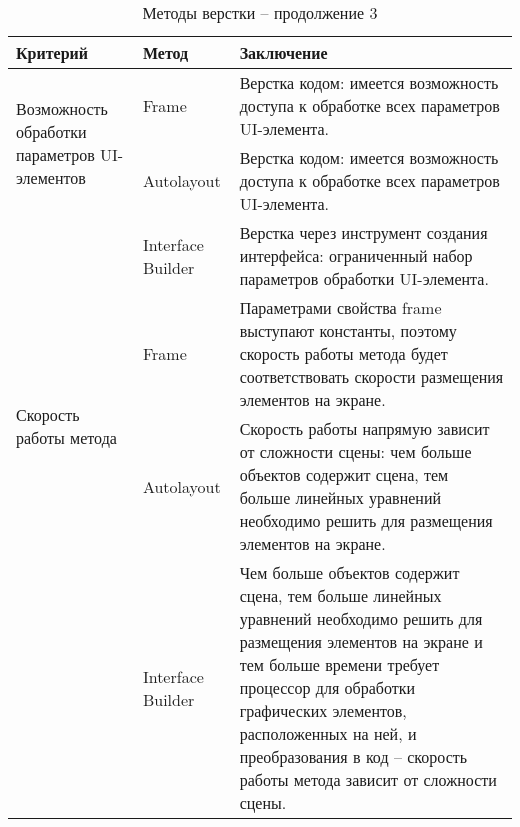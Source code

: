 \begin{table}[H]
	\centering
	\caption{Методы верстки -- продолжение 3}
	\label{mko_table_0}
	\begin{tabular}{|p{2.9cm}|p{2.9cm}|p{9.5cm}|}
		\hline
		\textbf{Критерий} & \textbf{Метод} & \textbf{Заключение} \\
		\hline
		\multirow{2}{3.1cm}{Возможность обработки параметров UI-элементов} & Frame & 
		Верстка кодом: имеется возможность доступа к обработке всех параметров UI-элемента.\\
		\cline{2-3} & Autolayout & 
		Верстка кодом: имеется возможность доступа к обработке всех параметров UI-элемента.\\
		\cline{2-3} & Interface Builder & 
		Верстка через инструмент создания интерфейса: ограниченный набор параметров обработки UI-элемента.\\
		\hline
		\multirow{2}{3.1cm}{Скорость работы метода} & Frame & 
		Параметрами свойства frame выступают константы, поэтому скорость работы метода будет соответствовать скорости размещения элементов на экране.\\
		\cline{2-3} & Autolayout & 
		Скорость работы напрямую зависит от сложности сцены: чем больше объектов содержит сцена, тем больше линейных уравнений необходимо 
		решить для размещения элементов на экране.\\
		\cline{2-3} & Interface Builder & 
		Чем больше объектов содержит сцена, тем больше линейных уравнений необходимо решить для размещения элементов на экране 
		и тем больше времени требует процессор для обработки графических элементов, расположенных на ней, и преобразования в код 
		-- скорость работы метода зависит от сложности сцены. \\
		\hline
	\end{tabular}
\end{table}
